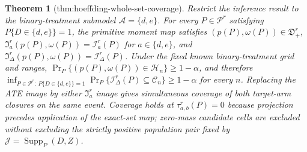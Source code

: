 \documentclass{article}
\newtheorem{theorem}{Theorem}
\begin{document}
\begin{theorem}[thm:hoeffding-whole-set-coverage]\label{thm:hoeffding-whole-set-coverage}
Restrict the inference result to the binary-treatment submodel \(\mathcal A=\{d,e\}\). For every \(P\in\mathcal P^r\) satisfying \(P\{D\in\{d,e\}\}=1\), the primitive moment map satisfies \((p(P),\omega(P))\in\mathfrak D_+^r\), \(\mathfrak I_a^r(p(P),\omega(P))=\mathcal I_a^r(P)\) for \(a\in\{d,e\}\), and \(\mathfrak I_{\Delta}^r(p(P),\omega(P))=\mathcal I_{\Delta}^r(P)\). Under the fixed known binary-treatment grid and ranges, \(\Pr_P\{(p(P),\omega(P))\in\mathcal H_n\}\ge1-\alpha\), and therefore \(\inf_{P\in\mathcal P^r:\,P\{D\in\{d,e\}\}=1}\Pr_P\{\mathcal I_{\Delta}^r(P)\subseteq\mathcal C_n\}\ge1-\alpha\) for every \(n\). Replacing the ATE image by either \(\mathfrak I_a^r\) image gives simultaneous coverage of both target-arm closures on the same event. Coverage holds at \(\tau_{a,b}^r(P)=0\) because projection precedes application of the exact-set map; zero-mass candidate cells are excluded without excluding the strictly positive population pair fixed by \(\mathcal J=\operatorname{Supp}_P(D,Z)\).
\end{theorem}
\end{document}
